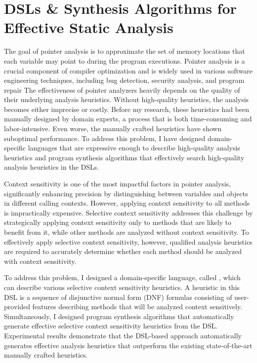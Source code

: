 \documentclass[11pt]{article}
\newcommand{\myparagraph}[1]{\medskip\noindent{\it \textbf{#1.}}}
\begin{document}
\section{DSLs \& Synthesis Algorithms for Effective Static Analysis}
%
The goal of pointer analysis is to approximate the set of memory locations that each variable may point to during the program executions.
%
Pointer analysis is a crucial component of compiler optimization and is widely used in various software engineering techniques, including bug detection, security analysis, and program repair
%
The effectiveness of pointer analyzers heavily depends on the quality of their underlying analysis heuristics. 
%
Without high-quality heuristics, the analysis becomes either imprecise or costly. 
%
Before my research, these heuristics had been manually designed by domain experts, a process that is both time-consuming and labor-intensive. 
%
Even worse, the manually crafted heuristics have shown suboptimal performance.
%
To address this problem, I have designed domain-specific languages that are expressive enough to describe high-quality analysis heuristics and program synthesis algorithms that effectively search  high-quality analysis heuristics in the DSLs.



\myparagraph{Disjunctive Model $\&$ Synthesis Algorithms~\cite{JeJeChOh17,Jeon2019,IST2021}}
%
Context sensitivity is one of the most impactful factors in pointer analysis, significantly enhancing precision by distinguishing between variables and objects in different calling contexts.
%
However, applying context sensitivity to all methods is impractically expensive. 
%
Selective context sensitivity addresses this challenge by strategically applying context sensitivity only to methods that are likely to benefit from it, while other methods are analyzed without context sensitivity.
%
To effectively apply selective context sensitivity, however, qualified analysis heuristics are required to accurately determine whether each method should be analyzed with context sensitivity.




To address this problem, I designed a domain-specific language, called \DisjunctiveModel, which can describe various selective context sensitivity heuristics.
%
A heuristic in this DSL is a sequence of disjunctive normal form (DNF) formulas consisting of user-provided features describing methods that will be analyzed context sensitively.
%
Simultaneously, I designed program synthesis algorithms that automatically generate effective selective context sensitivity heuristics from the DSL.
%
Experimental results demonstrate that the DSL-based approach automatically generates effective analysis heuristics that outperform the existing state-of-the-art manually crafted heuristics.
\end{document}
